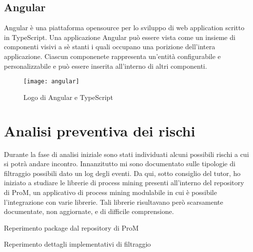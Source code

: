 \subsection {Angular}
Angular è una piattaforma opensource per lo sviluppo di web application scritto in TypeScript.
Una applicazione Angular può essere vista come un insieme di componenti visivi a sè stanti i quali occupano una porizione dell'intera applicazione. Ciascun componenete rappresenta un'entità configurabile e personalizzabile e può essere inserita all'interno di altri componenti.
\begin{figure}[!h] 
	\centering 
	\texttt{[image: angular]} 
	\caption{Logo di Angular e TypeScript}
\end{figure}
\section{Analisi preventiva dei rischi}

Durante la fase di analisi iniziale sono stati individuati alcuni possibili rischi a cui si potrà andare incontro. Innanzitutto mi sono documentato sulle tipologie di filtraggio possibili dato un log degli eventi. Da qui, sotto consiglio del tutor, ho iniziato a studiare le librerie di process mining presenti all'interno del repository di ProM, un applicativo di process mining modulabile in cui è possibile l'integrazione con varie librerie. Tali librerie risultavano però scarsamente documentate, non aggiornate, e di difficile comprensione.\\

\begin{risk}{Reperimento package dal repository di ProM}
\end{risk}

\begin{risk}{Reperimento dettagli implementativi di filtraggio}
\end{risk}


